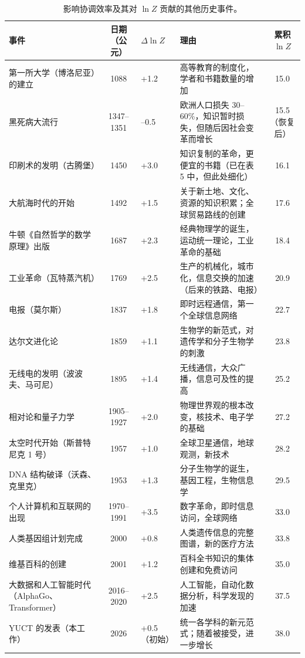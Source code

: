 \documentclass[12pt,a4paper]{article}
\theoremstyle{remark}
\begin{document}
		\begin{table}[htbp]
			\centering
			\caption{影响协调效率及其对 $\ln Z$ 贡献的其他历史事件。}
			\label{tab:expanded-events}
			\scriptsize  
			\begin{tabular}{p{3.2cm} c p{2.5cm} p{4.5cm} c}
				\toprule
				\textbf{事件} & \textbf{日期（公元）} & \textbf{$\Delta \ln Z$} & \textbf{理由} & \textbf{累积 $\ln Z$} \\
				\midrule
				第一所大学（博洛尼亚）的建立 & 1088 & +1.2 & 高等教育的制度化，学者和书籍数量的增加 & 15.0 \\
				黑死病大流行 & 1347–1351 & –0.5 & 欧洲人口损失 30–60\%，知识暂时损失，但随后因社会变革而增长 & 15.5（恢复后） \\
				印刷术的发明（古腾堡） & 1450 & +3.0 & 知识复制的革命，更便宜的书籍（已在表 5 中，但此处细化） & 16.1 \\
				大航海时代的开始 & 1492 & +1.5 & 关于新土地、文化、资源的知识积累；全球贸易路线的创建 & 17.6 \\
				牛顿《自然哲学的数学原理》出版 & 1687 & +2.3 & 经典物理学的诞生，运动统一理论，工业革命的基础 & 18.4 \\
				工业革命（瓦特蒸汽机） & 1769 & +2.5 & 生产的机械化，城市化，信息交换的加速（后来的铁路、电报） & 20.9 \\
				电报（莫尔斯） & 1837 & +1.8 & 即时远程通信，第一个全球信息网络 & 22.7 \\
				达尔文进化论 & 1859 & +1.1 & 生物学的新范式，对遗传学和分子生物学的刺激 & 23.8 \\
				无线电的发明（波波夫、马可尼） & 1895 & +1.4 & 无线通信，大众广播，信息可及性的提高 & 25.2 \\
				相对论和量子力学 & 1905–1927 & +2.0 & 物理世界观的根本改变，核技术、电子学的基础 & 27.2 \\
				太空时代开始（斯普特尼克 1 号） & 1957 & +1.0 & 全球卫星通信，地球观测，新技术 & 28.2 \\
				DNA 结构破译（沃森、克里克） & 1953 & +1.3 & 分子生物学的诞生，基因工程，生物信息学 & 29.5 \\
				个人计算机和互联网的出现 & 1970–1991 & +3.5 & 数字革命，即时信息访问，全球网络 & 33.0 \\
				人类基因组计划完成 & 2000 & +0.8 & 人类遗传信息的完整图谱，新的医疗方法 & 33.8 \\
				维基百科的创建 & 2001 & +1.2 & 百科全书知识的集体创建和免费访问 & 35.0 \\
				大数据和人工智能时代（AlphaGo、Transformer） & 2016–2020 & +2.5 & 人工智能，自动化数据分析，科学发现的加速 & 37.5 \\
				YUCT 的发表（本工作） & 2026 & +0.5（初始） & 统一各学科的新元范式；随着被接受，进一步增长 & 38.0 \\
				\bottomrule
			\end{tabular}
		\end{table}
		
\end{document}
